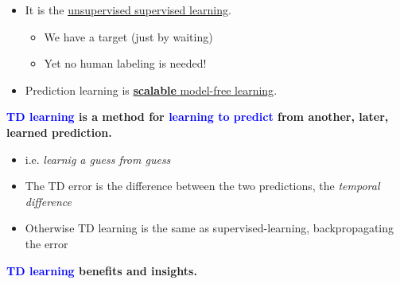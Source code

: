 \documentclass[12pt, a4paper]{article}
\begin{document}
\begin{itemize}
  \item It is the \uline{unsupervised supervised learning}.
  \begin{itemize}
    \item We have a target (just by waiting)
    \item Yet no human labeling is needed!
  \end{itemize}
  \item Prediction learning is \uline{\textbf{scalable} model-free learning}.
\end{itemize}


\textbf{\textcolor{blue}{TD learning} is a method for \textcolor{blue}{learning to predict} from another, later, learned prediction.}

\begin{itemize}
  \item i.e. \textit{learnig a guess from guess}
  \item The TD error is the difference between the two predictions, the \textit{temporal difference}
  \item Otherwise TD learning is the same as supervised-learning, backpropagating the error
\end{itemize}


\textbf{\textcolor{blue}{TD learning} benefits and insights.}
\end{document}
